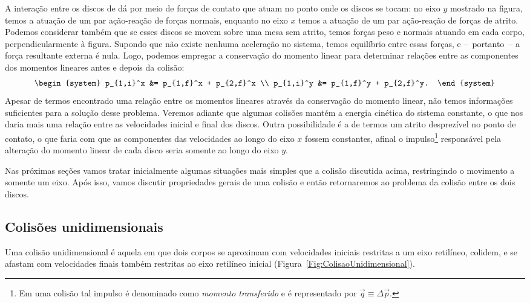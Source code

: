 A interação entre os discos de dá por meio de forças de contato que atuam no ponto onde os discos se tocam: no eixo $y$ mostrado na figura, temos a atuação de um par ação-reação de forças normais, enquanto no eixo $x$ temos a atuação de um par ação-reação de forças de atrito. Podemos considerar também que se esses discos se movem sobre uma mesa sem atrito, temos forças peso e normais atuando em cada corpo, perpendicularmente à figura. Supondo que não existe nenhuma aceleração no sistema, temos equilíbrio entre essas forças, e --~portanto~-- a força resultante externa é nula. Logo, podemos empregar a conservação do momento linear para determinar relações entre as componentes dos momentos lineares antes e depois da colisão:
\begin{equation}
\begin{system}
    p_{1,i}^x &= p_{1,f}^x + p_{2,f}^x \\
    p_{1,i}^y &= p_{1,f}^y + p_{2,f}^y.
\end{system}
\end{equation}
%
Apesar de termos encontrado uma relação entre os momentos lineares através da conservação do momento linear, não temos informações suficientes para a solução desse problema. Veremos adiante que algumas colisões mantém a energia cinética do sistema constante, o que nos daria mais uma relação entre as velocidades inicial e final dos discos. Outra possibilidade é a de termos um atrito desprezível no ponto de contato, o que faria com que as componentes das velocidades ao longo do eixo $x$ fossem constantes, afinal o impulso\footnote{Em uma colisão tal impulso é denominado como \emph{momento transferido} e é representado por $\vec{q} \equiv \Delta \vec{p}$.} responsável pela alteração do momento linear de cada disco seria somente ao longo do eixo $y$.

Nas próximas seções vamos tratar inicialmente algumas situações mais simples que a colisão discutida acima, restringindo o movimento a somente um eixo. Após isso, vamos discutir propriedades gerais de uma colisão e então retornaremos ao problema da colisão entre os dois discos.

\subsection{Colisões unidimensionais}

Uma colisão unidimensional é aquela em que dois corpos se aproximam com velocidades iniciais restritas a um eixo retilíneo, colidem, e se afastam com velocidades finais também restritas ao eixo retilíneo inicial (Figura~\ref{Fig:ColisaoUnidimensional}).

